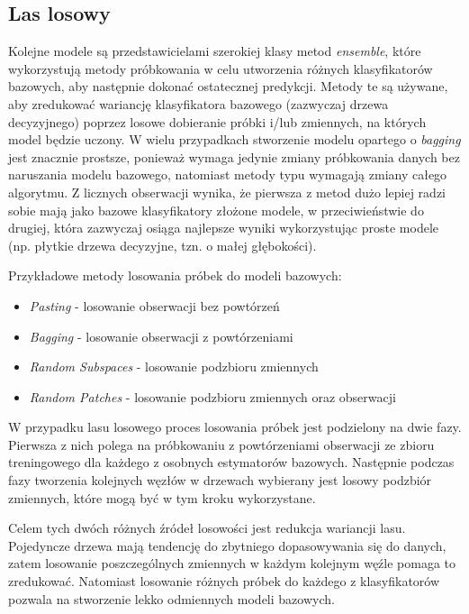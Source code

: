 \documentclass[inzynierska]{pwr_wmat_praca_dyplomowa}
\theoremstyle{plain}
\numberwithin{theorem}{chapter}
\theoremstyle{definition}
\numberwithin{theorem}{chapter}
\begin{document}
\subsection{Las losowy}
Kolejne modele są przedstawicielami szerokiej klasy metod \textit{ensemble}, które wykorzystują metody próbkowania w celu utworzenia różnych klasyfikatorów bazowych, aby następnie dokonać ostatecznej predykcji. Metody te są używane, aby zredukować wariancję klasyfikatora bazowego (zazwyczaj drzewa decyzyjnego) poprzez losowe dobieranie próbki i/lub zmiennych, na których model będzie uczony. W wielu przypadkach stworzenie modelu opartego o \textit{bagging} jest znacznie prostsze, ponieważ wymaga jedynie zmiany próbkowania danych bez naruszania modelu bazowego, natomiast metody typu  wymagają zmiany całego algorytmu. Z licznych obserwacji wynika, że pierwsza z metod dużo lepiej radzi sobie mają jako bazowe klasyfikatory złożone modele, w przeciwieństwie do drugiej, która zazwyczaj osiąga najlepsze wyniki wykorzystując proste modele (np. płytkie drzewa decyzyjne, tzn. o małej głębokości).

Przykładowe metody losowania próbek do modeli bazowych:
\begin{itemize}
	\item \textit{Pasting} - losowanie obserwacji bez powtórzeń
	\item \textit{Bagging} - losowanie obserwacji z powtórzeniami
	\item \textit{Random Subspaces} - losowanie podzbioru zmiennych
	\item \textit{Random Patches} - losowanie podzbioru zmiennych oraz obserwacji 
\end{itemize}

W przypadku lasu losowego proces losowania próbek jest podzielony na dwie fazy. Pierwsza z nich polega na próbkowaniu z powtórzeniami obserwacji ze zbioru treningowego dla każdego z osobnych estymatorów bazowych. Następnie podczas fazy tworzenia kolejnych węzłów w drzewach wybierany jest losowy podzbiór zmiennych, które mogą być w tym kroku wykorzystane. 

Celem tych dwóch różnych źródeł losowości jest redukcja wariancji lasu. Pojedyncze drzewa mają tendencję do zbytniego dopasowywania się do danych, zatem losowanie poszczególnych zmiennych w każdym kolejnym węźle pomaga to zredukować. Natomiast losowanie różnych próbek do każdego z klasyfikatorów pozwala na stworzenie lekko odmiennych modeli bazowych.
\end{document}
